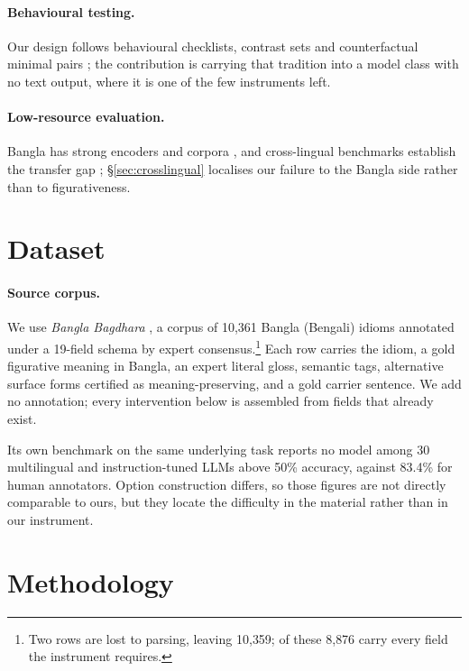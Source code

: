 \documentclass[11pt]{article}
\begin{document}
\paragraph{Behavioural testing.} Our design follows behavioural checklists,
contrast sets and counterfactual minimal pairs
\citep{ribeiro2020checklist,gardner2020contrast,kaushik2020difference,naik2018stress,jia2017adversarial};
the contribution is carrying that tradition into a model class with no text
output, where it is one of the few instruments left.

\paragraph{Low-resource evaluation.} Bangla has strong encoders and corpora
\citep{bhattacharjee2022banglabert,kakwani2020indicnlpsuite}, and cross-lingual
benchmarks establish the transfer gap
\citep{hu2020xtreme,ruder2021xtremer,adelani2021masakhaner};
\S\ref{sec:crosslingual} localises our failure to the Bangla side rather than to
figurativeness.

\section{Dataset}
\label{sec:dataset}

\paragraph{Source corpus.} We use \emph{Bangla Bagdhara}
\citep{sakhawat-etal-2026-words}, a corpus of 10{,}361 Bangla (Bengali) idioms
annotated under a 19-field schema by expert consensus.\footnote{Two rows are
lost to parsing, leaving 10{,}359; of these 8{,}876 carry every field the
instrument requires.} Each row carries the idiom,
a gold figurative meaning in Bangla, an expert literal gloss, semantic tags,
alternative surface forms certified as meaning-preserving, and a gold carrier
sentence. We add no annotation; every intervention below is assembled from
fields that already exist.

Its own benchmark on the same underlying task reports no model among 30
multilingual and instruction-tuned LLMs above 50\% accuracy, against 83.4\% for
human annotators. Option construction differs, so those figures are not directly
comparable to ours, but they locate the difficulty in the material rather than
in our instrument.

\section{Methodology}
\label{sec:instrument}
\end{document}
